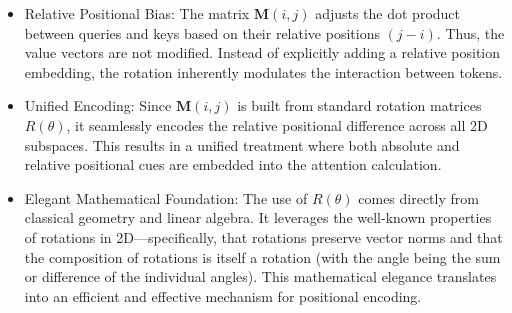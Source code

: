 \begin{itemize}
	\item Relative Positional Bias:  
  The matrix \(\mathbf{M}(i,j)\) adjusts the dot product between queries and keys based on their relative positions \((j-i)\). Thus, the value vectors are not modified. Instead of explicitly adding a relative position embedding, the rotation inherently modulates the interaction between tokens.
	\item Unified Encoding: Since \(\mathbf{M}(i,j)\) is built from standard rotation matrices \(R(\theta)\), it seamlessly encodes the relative positional difference across all 2D subspaces. This results in a unified treatment where both absolute and relative positional cues are embedded into the attention calculation.
	\item Elegant Mathematical Foundation: The use of \(R(\theta)\) comes directly from classical geometry and linear algebra. It leverages the well-known properties of rotations in 2D—specifically, that rotations preserve vector norms and that the composition of rotations is itself a rotation (with the angle being the sum or difference of the individual angles). This mathematical elegance translates into an efficient and effective mechanism for positional encoding.
\end{itemize}


